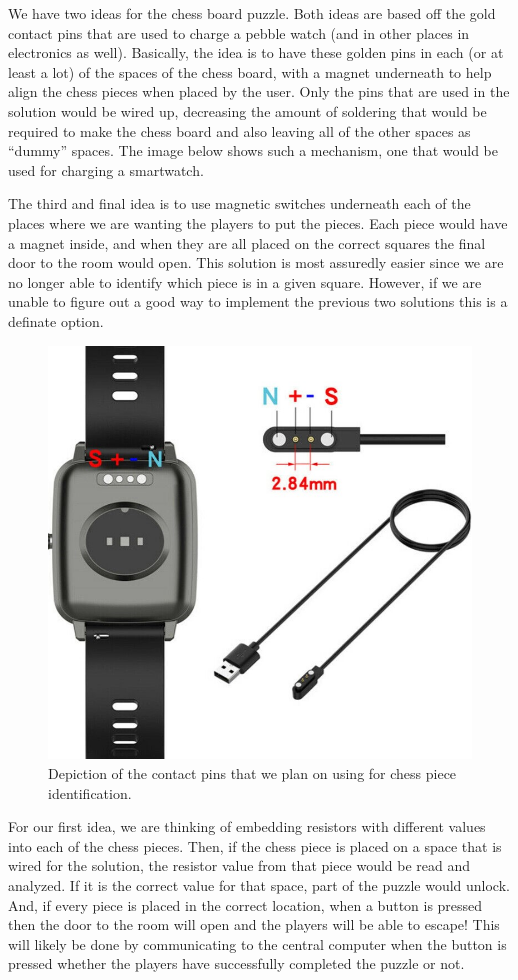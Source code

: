 \documentclass[conference]{IEEEtran}
\begin{document}
We have two ideas for the chess board puzzle. Both ideas are based off the gold contact pins that are used
to charge a pebble watch (and in other places in electronics as well). Basically, the idea
is to have these golden pins in each (or at least a lot) of the spaces of the chess board, with
a magnet underneath to help align the chess pieces when placed by the user. Only the pins that are used in
the solution would be wired up, decreasing the amount of soldering that would be required to make the chess
board and also leaving all of the other spaces as ``dummy'' spaces. The image below shows such a
mechanism, one that would be used for charging a smartwatch.

The third and final idea is to use magnetic switches underneath each of the places where we are wanting the players
to put the pieces. Each piece would have a magnet inside, and when they are all placed on the correct squares the
final door to the room would open. This solution is most assuredly easier since we are no longer able to identify
which piece is in a given square. However, if we are unable to figure out a good way to implement the previous
two solutions this is a definate option.

\begin{figure}[ht]
    \centering
    \includegraphics[width=0.75\columnwidth]{Images/pebble charger.jpg}
    \caption{Depiction of the contact pins that we plan on using for chess piece identification.}
\end{figure}

For our first idea, we are thinking of embedding resistors with different values into
each of the chess pieces. Then, if the chess piece is placed on a space that is wired for the solution,
the resistor value from that piece would be read and analyzed. If it is the correct value for that space,
part of the puzzle would unlock. And, if every piece is placed in the correct location, when a button is
pressed then the door to the room will open and the players will be able to escape! This will likely be done
by communicating to the central computer when the button is pressed whether the players
have successfully completed the puzzle or not.
\end{document}
